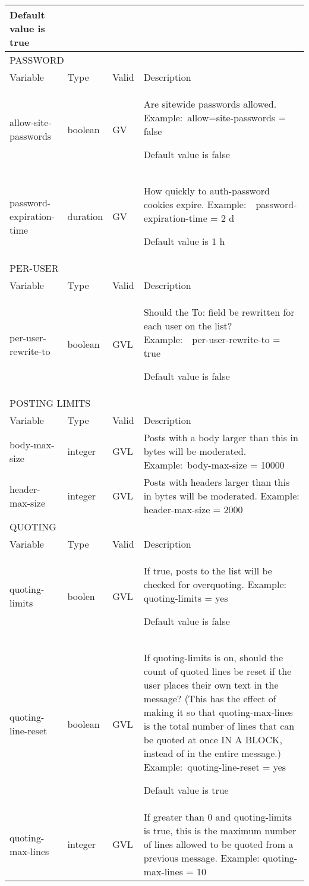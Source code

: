 \documentclass{book}
\begin{document}
\begin{longtable}{p{30mm}llp{60mm}}
Default value is true\\
\hline
\multicolumn{4}{l}{PASSWORD}\\
\hline
Variable & Type & Valid & Description\\
\hline
allow-site-passwords & boolean & GV & Are sitewide passwords allowed.
Example: allow=site-passwords = false

Default value is false\\
\hline
password-expiration-time & duration & GV & How quickly to auth-password cookies expire.
Example:  password-expiration-time = 2 d

Default value is 1 h\\
\hline
\multicolumn{4}{l}{PER-USER}\\
\hline
Variable & Type & Valid & Description\\
\hline
per-user-rewrite-to & boolean & GVL & Should the To: field be rewritten for each user on the list?
Example:  per-user-rewrite-to = true

Default value is false\\
\hline
\multicolumn{4}{l}{POSTING LIMITS}\\
\hline
Variable & Type & Valid & Description\\
\hline
body-max-size & integer & GVL & Posts with a body larger than this in bytes will be moderated.
Example: body-max-size = 10000\\
\hline
header-max-size & integer & GVL & Posts with headers larger than this in bytes will be moderated.
Example: header-max-size = 2000\\
\hline
\multicolumn{4}{l}{QUOTING}\\
\hline
Variable & Type & Valid & Description\\
\hline
quoting-limits & boolen & GVL & If true, posts to the list will be checked for overquoting.
Example: quoting-limits = yes

Default value is false\\
\hline
quoting-line-reset & boolean & GVL & If quoting-limits is on, should the count of quoted lines be reset if the user places their own text in the message? (This has the effect of making it so that quoting-max-lines is the total number of lines that can be quoted at once IN A BLOCK, instead of in the entire message.)
Example: quoting-line-reset = yes

Default value is true\\
\hline
quoting-max-lines & integer & GVL & If greater than 0 and quoting-limits is true, this is the maximum number of lines allowed to be quoted from a previous message.
Example: quoting-max-lines = 10


\end{longtable}
\end{document}
